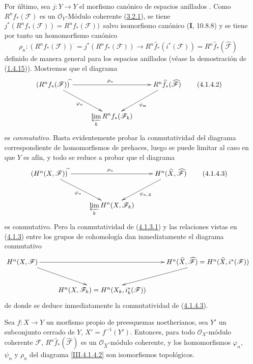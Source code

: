 \begin{env}[4.1.4]
\label{III.4.1.4}
\label{III.4.1.4-fr}
Por último, sea $j:\widehat Y\to Y$ el morfismo canónico de espacios
anillados .
Como $R^nf_*(\mathcal F)$ es un $\mathcal O_Y$-Módulo coherente (\hyperref[III.3.2.1-fr]{3.2.1}), se tiene $j^*(R^nf_*(\mathcal F))=R^nf_*(\mathcal F))^{\widehat{\,}}$ salvo isomorfismo canónico (\textbf{I}, 10.8.8) y se tiene por tanto un homomorfismo canónico \[
\rho_n:(R^nf_*(\mathcal F))^{\widehat{\,}}=j^*(R^nf_*(\mathcal F))
\longrightarrow R^n\widehat f_*(i^*(\mathcal F))
=R^n\widehat f_*(\widehat{\mathcal F})
\tag{4.1.4.1}\label{III.4.1.4.1-fr}
\]
definido de manera general para los espacios anillados (véase la demostración
de (\hyperref[III.1.4.15-fr]{1.4.15})). Mostremos que el diagrama
\[
\xymatrix{
(R^nf_*(\mathcal F))^{\widehat{\,}}\ar[rr]^{\rho_n}\ar[dr]_{\varphi_n}
&&R^n\widehat f_*(\widehat{\mathcal F})\ar[dl]^{\psi_{\boldsymbol{n}}}\\
&\displaystyle\varprojlim_kR^nf_*(\mathcal F_k)&
}
\tag{4.1.4.2}\label{III.4.1.4.2-fr}
\] es \emph{conmutativo}. Basta evidentemente probar la conmutatividad del diagrama correspondiente de homomorfismos de prehaces, luego se puede limitar al caso en que $Y$ es afín, y todo se reduce a probar que el diagrama \[
\xymatrix{
(H^n(X,\mathcal F))^{\widehat{\,}}\ar[rr]^{\rho_n}\ar[dr]_{\varphi_n}
&&H^n(\widehat X,\widehat{\mathcal F})\ar[dl]^{\psi_{n,X}}\\
&\displaystyle\varprojlim_kH^n(X,\mathcal F_k)&
}
\tag{4.1.4.3}\label{III.4.1.4.3-fr}
\]
es conmutativo. Pero la conmutatividad de
(\hyperref[III.4.1.3.1-fr]{4.1.3.1}) y las relaciones vistas en
(\hyperref[III.4.1.3-fr]{4.1.3}) entre los grupos de cohomología dan
inmediatamente el diagrama conmutativo
\[
\xymatrix{
H^n(X,\mathcal F)\ar[rr]\ar[dr]&&
H^n(\widehat X,\widehat{\mathcal F})
=H^n(\widehat X,i^*(\mathcal F))\ar[dl]\\
&H^n(X,\mathcal F_k)=H^n(X_k,i_k^*(\mathcal F))&
}
\]
de donde se deduce inmediatamente la conmutatividad de
(\hyperref[III.4.1.4.3-fr]{4.1.4.3}).
\end{env}

\begin{theorem}[4.1.5]
\label{III.4.1.5}
\label{III.4.1.5-fr}
Sea $f:X\to Y$ un morfismo propio de preesquemas noetherianos, sea
$Y'$ un subconjunto cerrado de $Y$, $X'=f^{-1}(Y')$.
Entonces, para todo $\mathcal O_X$-módulo coherente $\mathcal F$,
$R^n\widehat f_*(\widehat{\mathcal F})$
es un $\mathcal O_{\widehat X}$-módulo coherente, y los homomorfismos
$\varphi_n$, $\psi_n$ y $\rho_n$ del diagrama
\eqref{III.4.1.4.2} son isomorfismos topológicos.
\end{theorem}

